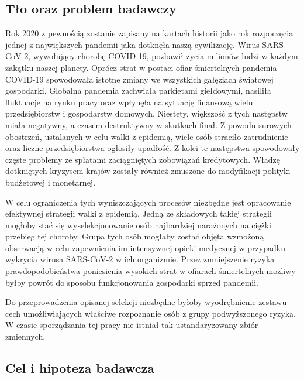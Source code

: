 \documentclass[polish, twoside, 12pt, a4paper]{article}
\theoremstyle{definition}
\theoremstyle{plain}
\theoremstyle{remark}
\begin{document}


\subsection{Tło oraz problem badawczy}

Rok 2020 z pewnością zostanie zapisany na kartach historii jako rok rozpoczęcia jednej z największych pandemii jaka dotknęła naszą cywilizację. Wirus SARS-CoV-2, wywołujący chorobę COVID-19, pozbawił życia milionów ludzi w każdym zakątku naszej planety. Oprócz strat w postaci ofiar śmiertelnych pandemia COVID-19 spowodowała istotne zmiany we wszystkich gałęziach światowej gospodarki. Globalna pandemia zachwiała parkietami giełdowymi, nasiliła fluktuacje na rynku pracy oraz wpłynęła na sytuację finansową wielu przedsiębiorstw i gospodarstw domowych. Niestety, większość z tych następstw miała negatywny, a czasem destruktywny w skutkach finał. Z powodu surowych obostrzeń, ustalanych w celu walki z epidemią, wiele osób straciło zatrudnienie oraz liczne przedsiębiorstwa ogłosiły upadłość. Z kolei te następstwa spowodowały częste problemy ze spłatami zaciągniętych zobowiązań kredytowych. Władzę dotkniętych kryzysem krajów zostały również zmuszone do modyfikacji polityki budżetowej i monetarnej.  

W celu ograniczenia tych wyniszczających procesów niezbędne jest opracowanie efektywnej strategii walki z epidemią. Jedną ze składowych takiej strategii mogłoby stać się wyselekcjonowanie osób najbardziej narażonych na ciężki przebieg tej choroby. Grupa tych osób mogłaby zostać objęta wzmożoną obserwacją w celu zapewnienia im intensywnej opieki medycznej w przypadku wykrycia wirusa SARS-CoV-2 w ich organizmie. Przez zmniejszenie ryzyka prawdopodobieństwa poniesienia wysokich strat w ofiarach śmiertelnych możliwy byłby powrót do sposobu funkcjonowania gospodarki sprzed pandemii. 

Do przeprowadzenia opisanej selekcji niezbędne byłoby wyodrębnienie zestawu cech umożliwiających właściwe rozpoznanie osób z grupy podwyższonego ryzyka. W czasie sporządzania tej pracy nie istniał tak ustandaryzowany zbiór zmiennych.

\subsection{Cel i hipoteza badawcza}
\end{document}
